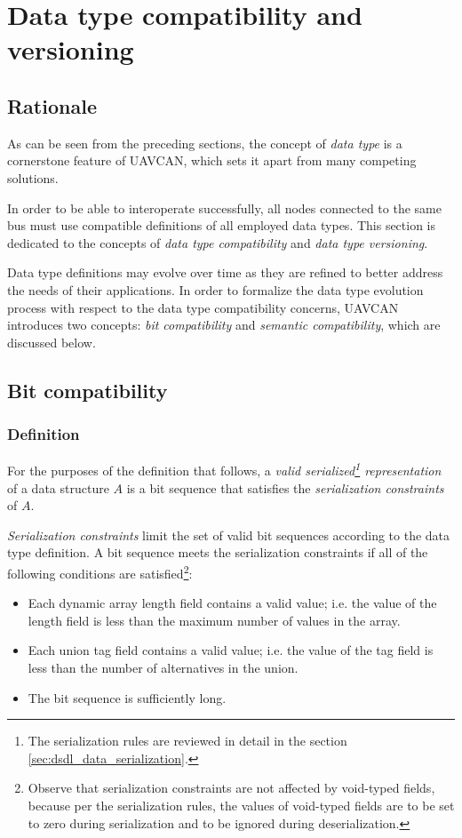 \section{Data type compatibility and versioning}\label{sec:dsdl_versioning}

\subsection{Rationale}

As can be seen from the preceding sections,
the concept of \emph{data type} is a cornerstone feature of UAVCAN,
which sets it apart from many competing solutions.

In order to be able to interoperate successfully,
all nodes connected to the same bus must use compatible definitions of all employed data types.
This section is dedicated to the concepts of \emph{data type compatibility}
and \emph{data type versioning}.

Data type definitions may evolve over time as they are refined to better address the needs of their applications.
In order to formalize the data type evolution process with respect to the data type compatibility concerns,
UAVCAN introduces two concepts: \emph{bit compatibility} and \emph{semantic compatibility},
which are discussed below.

\subsection{Bit compatibility}

\subsubsection{Definition}

For the purposes of the definition that follows, a \emph{valid
serialized\footnote{The serialization rules are reviewed in detail in the section \ref{sec:dsdl_data_serialization}.}
representation} of a data structure $A$ is a bit sequence that satisfies the \emph{serialization constraints} of $A$.

\emph{Serialization constraints} limit the set of valid bit sequences according to the data type definition.
A bit sequence meets the serialization constraints if all of the following conditions are
satisfied\footnote{Observe that serialization constraints are not affected by void-typed fields,
because per the serialization rules, the values of void-typed fields are to be set to zero during serialization
and to be ignored during deserialization.}:
\begin{itemize}
    \item Each dynamic array length field contains a valid value;
    i.e. the value of the length field is less than the maximum number of values in the array.

    \item Each union tag field contains a valid value;
    i.e. the value of the tag field is less than the number of alternatives in the union.

    \item The bit sequence is sufficiently long.
\end{itemize}

